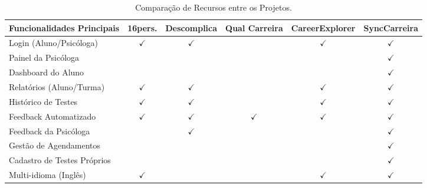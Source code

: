 \begin{table}[htb]
\ABNTEXfontereduzida
\caption[Comparação de Recursos entre os Projetos]{Comparação de Recursos entre os Projetos.}
\label{quadro-comparativo}
\begin{tabular}{|p{4cm}|c|c|c|c|c|}
\hline
\textbf{Funcionalidades Principais} & \textbf{16pers.} & \textbf{Descomplica} & \textbf{Qual Carreira} & \textbf{CareerExplorer} & \textbf{SyncCarreira} \\
\hline
Login (Aluno/Psicóloga) & $\checkmark$ & $\checkmark$ &  & $\checkmark$ & $\checkmark$ \\
\hline
Painel da Psicóloga &  &  &  &  & $\checkmark$ \\
\hline
Dashboard do Aluno &  &  &  &  & $\checkmark$ \\
\hline
Relatórios (Aluno/Turma) & $\checkmark$ & $\checkmark$ &  & $\checkmark$ & $\checkmark$ \\
\hline
Histórico de Testes & $\checkmark$ & $\checkmark$ &  & $\checkmark$ & $\checkmark$ \\
\hline
Feedback Automatizado & $\checkmark$ & $\checkmark$ & $\checkmark$ & $\checkmark$ & $\checkmark$ \\
\hline
Feedback da Psicóloga &  & $\checkmark$ &  &  & $\checkmark$ \\
\hline
Gestão de Agendamentos &  &  &  &  & $\checkmark$ \\
\hline
Cadastro de Testes Próprios &  &  &  &  & $\checkmark$ \\
\hline
Multi-idioma (Inglês) & $\checkmark$ &  &  & $\checkmark$ & $\checkmark$ \\
\hline
\end{tabular}
\end{table}
